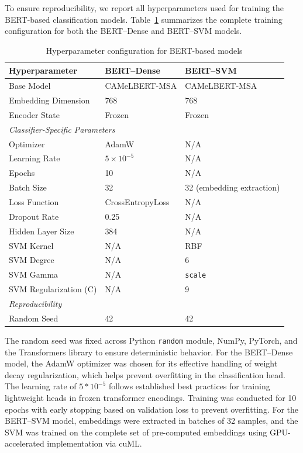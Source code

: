 \documentclass[sn-mathphys-num]{sn-jnl}
\begin{document}
To ensure reproducibility, we report all hyperparameters used for training the BERT-based classification models. Table~\ref{tab:hyperparameters} summarizes the complete training configuration for both the BERT–Dense and BERT–SVM models.

\begin{table}[!ht]
\centering
\caption{Hyperparameter configuration for BERT-based models}
\label{tab:hyperparameters}
\small
\begin{tabular}{l l l}
\hline
\textbf{Hyperparameter} & \textbf{BERT–Dense} & \textbf{BERT–SVM} \\
\hline
Base Model & CAMeLBERT-MSA & CAMeLBERT-MSA \\
Embedding Dimension & 768 & 768 \\
Encoder State & Frozen & Frozen \\
\hline
\multicolumn{3}{l}{\textit{Classifier-Specific Parameters}} \\
\hline
Optimizer & AdamW & N/A \\
Learning Rate & $5 \times 10^{-5}$ & N/A \\
Epochs & 10 & N/A \\
Batch Size & 32 & 32 (embedding extraction) \\
Loss Function & CrossEntropyLoss & N/A \\
Dropout Rate & 0.25 & N/A \\
Hidden Layer Size & 384 & N/A \\
SVM Kernel & N/A & RBF \\
SVM Degree & N/A & 6 \\
SVM Gamma & N/A & \texttt{scale} \\
SVM Regularization (C) & N/A & 9 \\
\hline
\multicolumn{3}{l}{\textit{Reproducibility}} \\
\hline
Random Seed & 42 & 42 \\
\hline
\end{tabular}
\end{table}

\noindent
The random seed was fixed across Python \texttt{random} module, NumPy, PyTorch, and the Transformers library to ensure deterministic behavior. For the BERT–Dense model, the AdamW optimizer was chosen for its effective handling of weight decay regularization, which helps prevent overfitting in the classification head. The learning rate of $5*10^{-5}$ follows established best practices for training lightweight heads in frozen transformer encodings. Training was conducted for 10 epochs with early stopping based on validation loss to prevent overfitting. For the BERT–SVM model, embeddings were extracted in batches of 32 samples, and the SVM was trained on the complete set of pre-computed embeddings using GPU-accelerated implementation via cuML.
\end{document}
